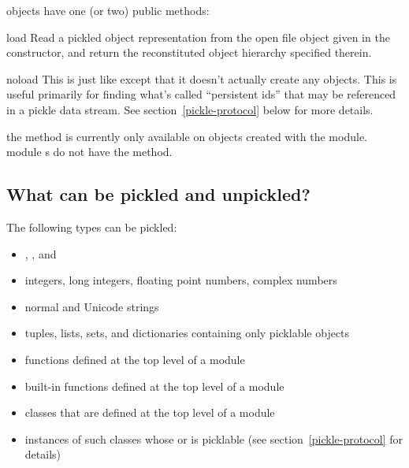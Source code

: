  objects have one (or two) public methods:

\begin{methoddesc}[Unpickler]{load}{}
Read a pickled object representation from the open file object given
in the constructor, and return the reconstituted object hierarchy
specified therein.
\end{methoddesc}

\begin{methoddesc}[Unpickler]{noload}{}
This is just like  except that it doesn't actually
create any objects.  This is useful primarily for finding what's
called ``persistent ids'' that may be referenced in a pickle data
stream.  See section~\ref{pickle-protocol} below for more details.

 the  method is currently only
available on  objects created with the
 module.   module s do
not have the  method.
\end{methoddesc}

\subsection{What can be pickled and unpickled?}

The following types can be pickled:

\begin{itemize}

\item {}, , and 

\item integers, long integers, floating point numbers, complex numbers

\item normal and Unicode strings

\item tuples, lists, sets, and dictionaries containing only picklable objects

\item functions defined at the top level of a module

\item built-in functions defined at the top level of a module

\item classes that are defined at the top level of a module

\item instances of such classes whose  or
 is picklable  (see
section~\ref{pickle-protocol} for details)

\end{itemize}

